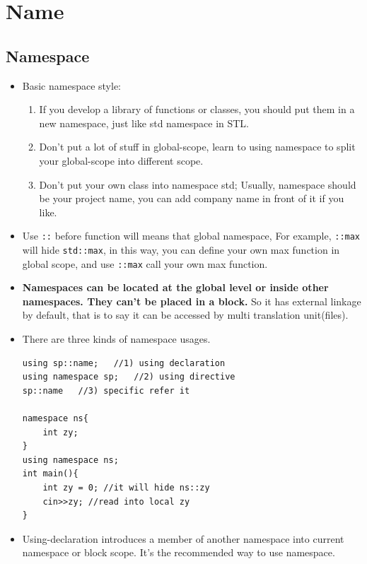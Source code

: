 \documentclass[a4paper,11pt,twoside]{book}
\begin{document}
\section{Name}
\subsection{Namespace}

\begin{itemize}
	\item Basic namespace style:
	\begin{enumerate}
		\item If you develop a library of functions or classes, you should put them in a new namespace, just like std namespace in STL.
		
		\item Don't put a lot of stuff in global-scope, learn to using namespace to split your global-scope into different scope. 
		
		\item Don't put your own class into namespace std; Usually, namespace should be your project name, you can add company name in front of it if you like.
	\end{enumerate}
	
	
	\item Use \texttt{::} before function will means that global namespace, For example, \texttt{::max} will hide \texttt{std::max}, in this way, you can define your own max function in global scope, and use \texttt{::max} call your own max function. 
	

	\item \textbf{Namespaces can be located at the global level or inside other namespaces. They can't be placed in a block.} So it has external linkage by default, that is to say it can be accessed by multi translation unit(files).


	\item There are three kinds of namespace usages.
\begin{lstlisting}[numbers = none]
using sp::name;   //1) using declaration
using namespace sp;   //2) using directive
sp::name   //3) specific refer it
	
namespace ns{
	int zy;
}
using namespace ns;
int main(){
	int zy = 0; //it will hide ns::zy
	cin>>zy; //read into local zy
}
\end{lstlisting}
	
	\item Using-declaration introduces a member of another namespace into current namespace or block scope. It's the recommended way to use namespace. 
	

\end{itemize}
\end{document}
